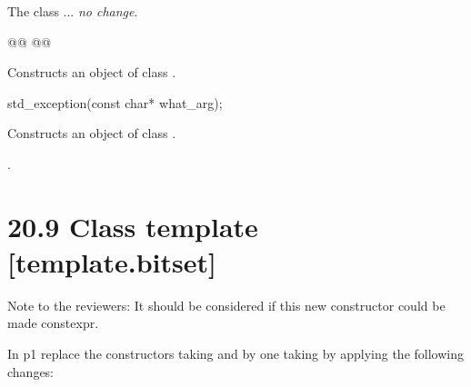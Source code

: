 \documentclass[ebook,11pt,article]{memoir}
\begin{document}
\pnum
The class
\emph{} ... \emph{no change}.

\begin{itemdecl}
@@
@@
\end{itemdecl}

\begin{itemdescr}
\pnum
\effects
Constructs an object of class
\emph{}.

\pnum
\postcondition
{}
\end{itemdescr}

\begin{removedblock}
\begin{itemdecl}
std_exception(const char* what_arg);
\end{itemdecl}

\begin{itemdescr}
\pnum
\effects
Constructs an object of class
.

\pnum
\postcondition
{}.
\end{itemdescr}
\end{removedblock}

\section{ 20.9 Class template   [template.bitset]}%

Note to the reviewers: It should be considered if this new constructor could be made constexpr.

In p1 replace the constructors taking  and  by one taking  by applying the following changes:
\end{document}
